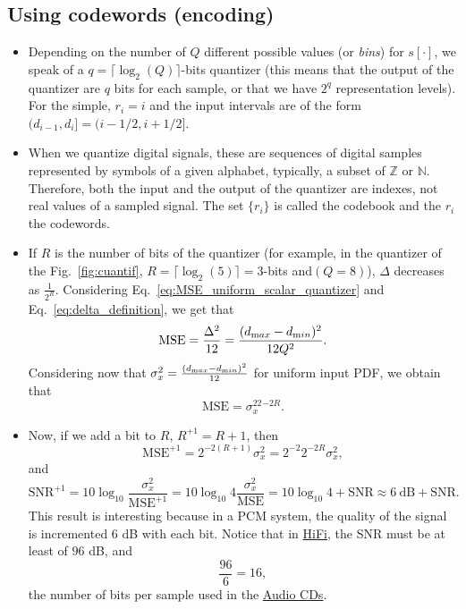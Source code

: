 \subsection{Using codewords (encoding)}
\begin{itemize}
  \tightlist
  
\item
  Depending on the number of \(Q\) different possible values (or
  \emph{bins}) for \(s[\cdot]\), we speak of a
  \(q=\lceil\log_2(Q)\rceil\)-bits quantizer (this means that the
  output of the quantizer are \(q\) bits for each sample, or that we
  have \(2^q\) representation levels). For the simple, $r_i=i$ and the
  input intervals are of the form $(d_{i-1},d_i]=(i-1/2,i+1/2]$.

\item
  When we quantize digital signals, these are sequences of digital
  samples represented by symbols of a given alphabet, typically, a
  subset of \({\mathbb{Z}}\) or \({\mathbb{N}}\). Therefore, both the
  input and the output of the quantizer are indexes, not real values
  of a sampled signal. The set $\{r_i\}$ is called the codebook and
  the $r_i$ the codewords.

\item If $R$ is the number of bits of the quantizer (for example, in
  the quantizer of the Fig.~\ref{fig:cuantif},
  $R=\lceil\log_2(5)\rceil=3$-bits and$(Q=8)$), $\Delta$ decreases as
  $\frac{1}{2^R}$. Considering
  Eq.~\ref{eq:MSE_uniform_scalar_quantizer} and
  Eq.~\ref{eq:delta_definition}, we get that
  \begin{equation}
    \text{MSE} = \frac{\Delta^2}{12} = \frac{(d_{\text max}-d_{\text min})^2}{12Q^2}.
  \end{equation}
  Considering now that $\sigma^2_x=\frac{(d_{\text max}-d_{\text
      min})^2}{12}$ for uniform input PDF, we obtain that
  \begin{equation}
    \text{MSE} =
    \sigma_x^22^{-2R}.
  \end{equation}

\item
  Now, if we add a bit to $R$, $R^{+1}=R+1$, then
  \begin{equation*}
    \text{MSE}^{+1}=2^{-2(R+1)}\sigma_x^2 = 2^{-2}2^{-2R}\sigma_x^2,
  \end{equation*}
  and
  \begin{equation*}
    \text{SNR}^{+1} = 10\log_{10}\frac{\sigma_x^2}{\text{MSE}^{+1}} = 10\log_{10}4\frac{\sigma_x^2}{\text{MSE}} =
    10\log_{10} 4 + \text{SNR} \approx  6~\text{dB} + \text{SNR}.
  \end{equation*}
  This result is interesting because in a PCM system, the quality of
  the signal is incremented $6$ dB with each bit. Notice that in
  \href{https://en.wikipedia.org/wiki/High_fidelity}{HiFi}, the SNR
  must be at least of $96$ dB, and
  \begin{equation*}
    \frac{96}{6} = 16,
  \end{equation*}
  the number of bits per sample used in the
  \href{https://en.wikipedia.org/wiki/Compact_disc}{Audio CDs}.
  

\end{itemize}
